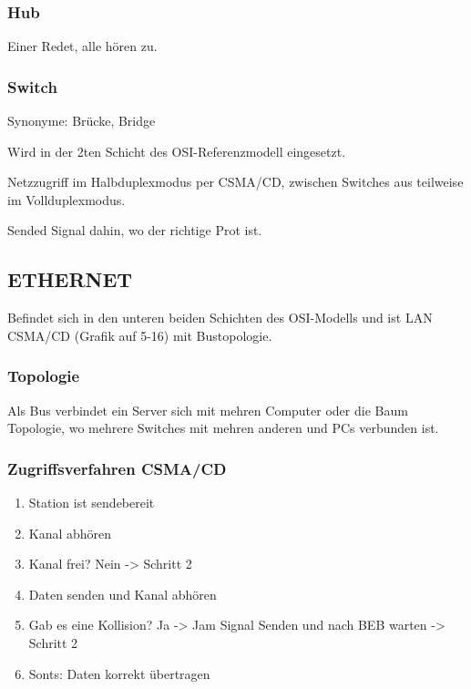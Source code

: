 \documentclass[a4paper]{article}
\begin{document}
\subsubsection{Hub}

Einer Redet, alle hören zu.

\subsubsection{Switch}

Synonyme: Brücke, Bridge

Wird in der 2ten Schicht des OSI-Referenzmodell eingesetzt.

Netzzugriff im Halbduplexmodus per CSMA/CD, zwischen Switches aus teilweise im Vollduplexmodus.

Sended Signal dahin, wo der richtige Prot ist.


\subsection{ETHERNET}


Befindet sich in den unteren beiden Schichten des OSI-Modells und ist LAN CSMA/CD (Grafik auf 5-16) mit Bustopologie.

\subsubsection{Topologie}

Als Bus verbindet ein Server sich mit mehren Computer oder die Baum Topologie, wo mehrere Switches mit mehren anderen und PCs verbunden ist.

\subsubsection{Zugriffsverfahren CSMA/CD}

\begin{enumerate}
    \item Station ist sendebereit
    \item Kanal abhören
    \item Kanal frei? Nein -> Schritt 2
    \item Daten senden und Kanal abhören
    \item Gab es eine Kollision? Ja -> Jam Signal Senden und nach BEB warten -> Schritt 2
    \item Sonts: Daten korrekt übertragen
\end{enumerate}
\end{document}
